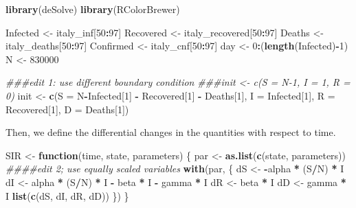 \documentclass[]{article}
\newenvironment{Shaded}{\begin{snugshade}}{\end{snugshade}}
\newcommand{\CommentTok}[1]{\textcolor[rgb]{0.56,0.35,0.01}{\textit{#1}}}
\newcommand{\ControlFlowTok}[1]{\textcolor[rgb]{0.13,0.29,0.53}{\textbf{#1}}}
\newcommand{\DataTypeTok}[1]{\textcolor[rgb]{0.13,0.29,0.53}{#1}}
\newcommand{\DecValTok}[1]{\textcolor[rgb]{0.00,0.00,0.81}{#1}}
\newcommand{\KeywordTok}[1]{\textcolor[rgb]{0.13,0.29,0.53}{\textbf{#1}}}
\newcommand{\NormalTok}[1]{#1}
\newcommand{\OperatorTok}[1]{\textcolor[rgb]{0.81,0.36,0.00}{\textbf{#1}}}
\newcommand{\StringTok}[1]{\textcolor[rgb]{0.31,0.60,0.02}{#1}}
\begin{document}
\begin{Shaded}
\begin{Highlighting}[]
\KeywordTok{library}\NormalTok{(deSolve)}
\KeywordTok{library}\NormalTok{(RColorBrewer)}

\NormalTok{Infected <-}\StringTok{ }\NormalTok{italy_inf[}\DecValTok{50}\OperatorTok{:}\DecValTok{97}\NormalTok{]}
\NormalTok{Recovered <-}\StringTok{ }\NormalTok{italy_recovered[}\DecValTok{50}\OperatorTok{:}\DecValTok{97}\NormalTok{]}
\NormalTok{Deaths <-}\StringTok{ }\NormalTok{italy_deaths[}\DecValTok{50}\OperatorTok{:}\DecValTok{97}\NormalTok{]}
\NormalTok{Confirmed <-}\StringTok{ }\NormalTok{italy_cnf[}\DecValTok{50}\OperatorTok{:}\DecValTok{97}\NormalTok{]}
\NormalTok{day <-}\StringTok{ }\DecValTok{0}\OperatorTok{:}\NormalTok{(}\KeywordTok{length}\NormalTok{(Infected)}\OperatorTok{-}\DecValTok{1}\NormalTok{)}
\NormalTok{N <-}\StringTok{ }\DecValTok{830000} 


\CommentTok{###edit 1: use different boundary condition}
\CommentTok{###init <- c(S = N-1, I = 1, R = 0)}
\NormalTok{init <-}\StringTok{ }\KeywordTok{c}\NormalTok{(}\DataTypeTok{S =}\NormalTok{ N}\OperatorTok{-}\NormalTok{Infected[}\DecValTok{1}\NormalTok{] }\OperatorTok{-}\StringTok{ }\NormalTok{Recovered[}\DecValTok{1}\NormalTok{] }\OperatorTok{-}\StringTok{ }\NormalTok{Deaths[}\DecValTok{1}\NormalTok{], }\DataTypeTok{I =}\NormalTok{ Infected[}\DecValTok{1}\NormalTok{], }\DataTypeTok{R =}\NormalTok{ Recovered[}\DecValTok{1}\NormalTok{], }\DataTypeTok{D =}\NormalTok{ Deaths[}\DecValTok{1}\NormalTok{])}
\end{Highlighting}
\end{Shaded}

Then, we define the differential changes in the quantities with respect
to time.

\begin{Shaded}
\begin{Highlighting}[]
\NormalTok{SIR <-}\StringTok{ }\ControlFlowTok{function}\NormalTok{(time, state, parameters) \{}
\NormalTok{  par <-}\StringTok{ }\KeywordTok{as.list}\NormalTok{(}\KeywordTok{c}\NormalTok{(state, parameters))}
  \CommentTok{####edit 2; use equally scaled variables }
  \KeywordTok{with}\NormalTok{(par, \{ dS <-}\StringTok{ }\OperatorTok{-}\NormalTok{alpha }\OperatorTok{*}\StringTok{ }\NormalTok{(S}\OperatorTok{/}\NormalTok{N) }\OperatorTok{*}\StringTok{ }\NormalTok{I}
\NormalTok{  dI <-}\StringTok{ }\NormalTok{alpha }\OperatorTok{*}\StringTok{ }\NormalTok{(S}\OperatorTok{/}\NormalTok{N) }\OperatorTok{*}\StringTok{ }\NormalTok{I }\OperatorTok{-}\StringTok{ }\NormalTok{beta }\OperatorTok{*}\StringTok{ }\NormalTok{I }\OperatorTok{-}\StringTok{ }\NormalTok{gamma }\OperatorTok{*}\StringTok{ }\NormalTok{I}
\NormalTok{  dR <-}\StringTok{ }\NormalTok{beta }\OperatorTok{*}\StringTok{ }\NormalTok{I}
\NormalTok{  dD <-}\StringTok{ }\NormalTok{gamma }\OperatorTok{*}\StringTok{ }\NormalTok{I}
  \KeywordTok{list}\NormalTok{(}\KeywordTok{c}\NormalTok{(dS, dI, dR, dD))}
\NormalTok{  \})}
\NormalTok{\}}
\end{Highlighting}
\end{Shaded}
\end{document}
